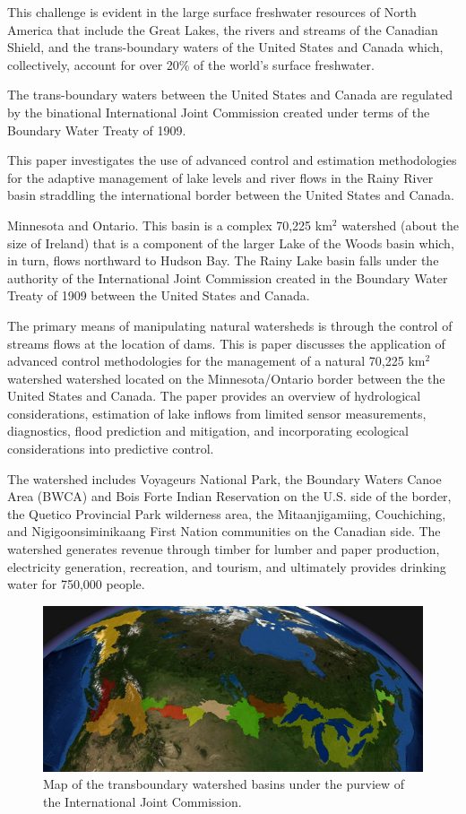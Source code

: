 \documentclass[preprint,times]{elsarticle}
\begin{document}
This challenge is evident in the large surface freshwater resources of North America that include the Great Lakes, the rivers and streams of the Canadian Shield, and the trans-boundary waters of the United States and Canada which, collectively, account for over 20\% of the world's surface freshwater.

The trans-boundary waters between the United States and Canada are regulated by the binational International Joint Commission created under terms of the Boundary Water Treaty of 1909.

This paper investigates the use of advanced control and estimation methodologies for the adaptive management of lake levels and river flows in the Rainy River basin straddling the international border between the United States and Canada.

Minnesota and Ontario. This basin is a complex 70,225 km$^2$ watershed (about the size of Ireland) that is a component of the larger Lake of the Woods basin which, in turn, flows northward to Hudson Bay. The Rainy Lake basin falls under the authority of the International Joint Commission created in the Boundary Water Treaty of 1909 between the United States and Canada.

The primary means of manipulating natural watersheds is through the control of streams flows at the location of dams. This is paper discusses the application of advanced control methodologies for the management of a natural 70,225 km$^2$ watershed watershed located on the Minnesota/Ontario border between the the United States and Canada. The paper provides an overview of hydrological considerations, estimation of lake inflows from limited sensor measurements, diagnostics, flood prediction and mitigation, and incorporating ecological considerations into predictive control.



 

The watershed includes Voyageurs National Park, the Boundary Waters Canoe Area (BWCA) and Bois Forte Indian Reservation on the U.S. side of the border, the Quetico Provincial Park wilderness area, the Mitaanjigamiing, Couchiching, and Nigigoonsiminikaang First Nation communities on the Canadian side. The watershed generates revenue through timber for lumber and paper production, electricity generation, recreation, and tourism, and ultimately provides drinking water for 750,000 people.

\begin{figure}
\includegraphics[width=\linewidth]{basins_map.png}
\caption{Map of the transboundary watershed basins under the purview of the International Joint Commission.}\label{figure:1}
\end{figure}
\end{document}
